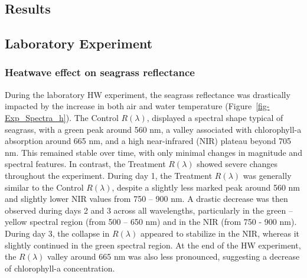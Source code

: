 \documentclass[
  letterpaper,
  11pt,
  english,
  singlespacing,
  headsepline]{MastersDoctoralThesis}
\begin{document}
\begin{spacing}{1.5}
\section{Results}\label{results-3}

\subsection{Laboratory Experiment}\label{laboratory-experiment-1}

\subsubsection{Heatwave effect on seagrass
reflectance}\label{heatwave-effect-on-seagrass-reflectance}

During the laboratory HW experiment, the seagrass reflectance was
drastically impacted by the increase in both air and water temperature
(Figure~\ref{fig-Exp_Spectra_h}). The Control \(R(\lambda)\), displayed
a spectral shape typical of seagrass, with a green peak around 560 nm, a
valley associated with chlorophyll-a absorption around 665 nm, and a
high near-infrared (NIR) plateau beyond 705 nm. This remained stable
over time, with only minimal changes in magnitude and spectral features.
In contrast, the Treatment \(R(\lambda)\) showed severe changes
throughout the experiment. During day 1, the Treatment \(R(\lambda)\)
was generally similar to the Control \(R(\lambda)\), despite a slightly
less marked peak around 560 nm and slightly lower NIR values from 750 --
900 nm. A drastic decrease was then observed during days 2 and 3 across
all wavelengths, particularly in the green -- yellow spectral region
(from 500 -- 650 nm) and in the NIR (from 750 - 900 nm). During day 3,
the collapse in \(R(\lambda)\) appeared to stabilize in the NIR, whereas
it slightly continued in the green spectral region. At the end of the HW
experiment, the \(R(\lambda)\) valley around 665 nm was also less
pronounced, suggesting a decrease of chlorophyll-a concentration.

\begin{figure}

\end{figure}
\end{spacing}
\end{document}
